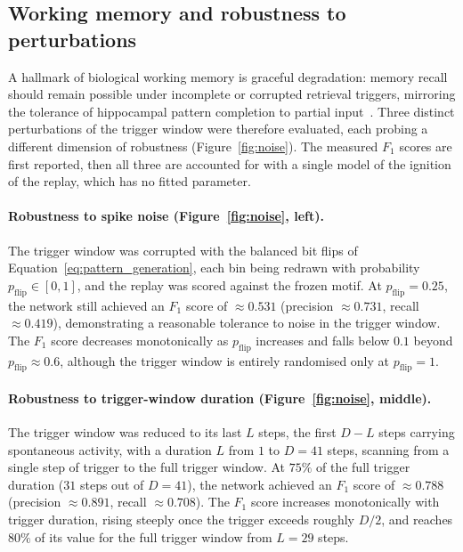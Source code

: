 \documentclass{scrartcl}
\newcommand{\citep}[1]{\parencite{#1}}
\begin{document}
\subsection{Working memory and robustness to perturbations}
\label{sec:robustness}
%
A hallmark of biological working memory is graceful degradation: memory recall should remain possible under incomplete or corrupted retrieval triggers, mirroring the tolerance of hippocampal pattern completion to partial input~\citep{Villette2015}. Three distinct perturbations of the trigger window were therefore evaluated, each probing a different dimension of robustness (Figure~\ref{fig:noise}). The measured $F_1$ scores are first reported, then all three are accounted for with a single model of the ignition of the replay, which has no fitted parameter.


\paragraph{Robustness to spike noise (Figure~\ref{fig:noise}, left).}
The trigger window was corrupted with the balanced bit flips of Equation~\ref{eq:pattern_generation}, each bin being redrawn with probability $p_\mathrm{flip} \in [0, 1]$, and the replay was scored against the frozen motif. At $p_\mathrm{flip} = 0.25$, the network still achieved an $F_1$ score of $\approx 0.531$ (precision $\approx 0.731$, recall $\approx 0.419$), demonstrating a reasonable tolerance to noise in the trigger window. The $F_1$ score decreases monotonically as $p_\mathrm{flip}$ increases and falls below $0.1$ beyond $p_\mathrm{flip} \approx 0.6$, although the trigger window is entirely randomised only at $p_\mathrm{flip} = 1$.

\paragraph{Robustness to trigger-window duration (Figure~\ref{fig:noise}, middle).}
The trigger window was reduced to its last $L$ steps, the first $D - L$ steps carrying spontaneous activity, with a duration $L$ from $1$ to $D = 41$ steps, scanning from a single step of trigger to the full trigger window. At $75\%$ of the full trigger duration ($31$ steps out of $D = 41$), the network achieved an $F_1$ score of $\approx 0.788$ (precision $\approx 0.891$, recall $\approx 0.708$). The $F_1$ score increases monotonically with trigger duration, rising steeply once the trigger exceeds roughly $D/2$, and reaches $80\%$ of its value for the full trigger window from $L = 29$ steps.
\end{document}
